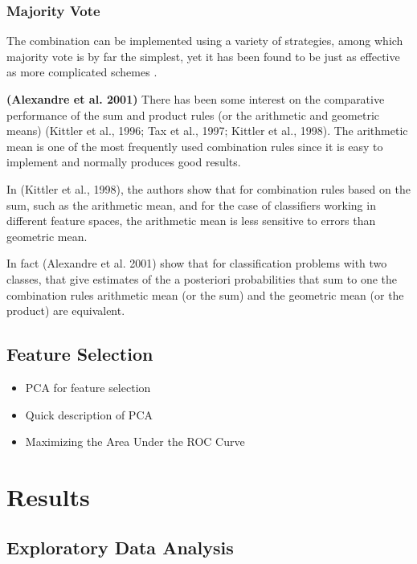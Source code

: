 \documentclass[12pt,]{article}
\providecommand{\tightlist}{%
  \setlength{\itemsep}{0pt}\setlength{\parskip}{0pt}}
\begin{document}
\subsubsection{Majority Vote}\label{majority-vote}

The combination can be implemented using a variety of strategies, among
which majority vote is by far the simplest, yet it has been found to be
just as effective as more complicated schemes \citep{lam_optimal_1995}.

\textbf{(Alexandre et al. 2001)} There has been some interest on the
comparative performance of the sum and product rules (or the arithmetic
and geometric means) (Kittler et al., 1996; Tax et al., 1997; Kittler et
al., 1998). The arithmetic mean is one of the most frequently used
combination rules since it is easy to implement and normally produces
good results.

In (Kittler et al., 1998), the authors show that for combination rules
based on the sum, such as the arithmetic mean, and for the case of
classifiers working in different feature spaces, the arithmetic mean is
less sensitive to errors than geometric mean.

In fact (Alexandre et al. 2001) show that for classification problems
with two classes, that give estimates of the a posteriori probabilities
that sum to one the combination rules arithmetic mean (or the sum) and
the geometric mean (or the product) are equivalent.

\subsection{Feature Selection}\label{feature-selection}

\begin{itemize}
\tightlist
\item
  PCA for feature selection
\item
  Quick description of PCA
\item
  Maximizing the Area Under the ROC Curve
\end{itemize}

\newpage

\section{Results}\label{results}

\subsection{Exploratory Data Analysis}\label{exploratory-data-analysis}
\end{document}
